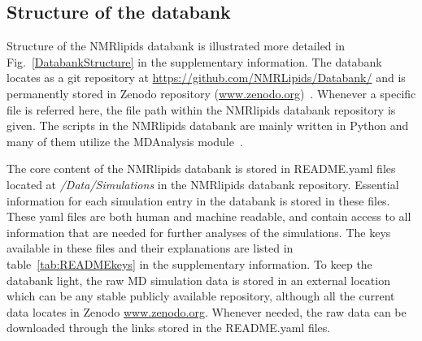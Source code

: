 \documentclass[fleqn,10pt]{wlscirep}
\begin{document}

\subsection{Structure of the databank}
Structure of the NMRlipids databank is illustrated more detailed in Fig.~\ref{DatabankStructure} in the supplementary information. The databank locates as a git repository at \url{https://github.com/NMRLipids/Databank/} and is permanently stored in Zenodo repository (\url{www.zenodo.org})~\cite{??}. Whenever a specific file is referred here, the file path within the NMRlipids databank repository is given. The scripts in the NMRlipids databank are mainly written in Python and many of them utilize the MDAnalysis module~\cite{gowers2019mdanalysis,michaud2011mdanalysis}.

The core content of the NMRlipids databank is stored in README.yaml files located at {\it /Data/Simulations} in the NMRlipids databank repository. Essential information for each simulation entry in the databank is stored in these files. These yaml files are both human and machine readable, and contain access to all information that are needed for further analyses of the simulations. The keys available in these files and their explanations are listed in table~\ref{tab:READMEkeys} in the supplementary information. To keep the databank light, the raw MD simulation data is stored in an external location which can be any stable publicly available repository, although all the current data locates in Zenodo \url{www.zenodo.org}. Whenever needed, the raw data can be downloaded through the links stored in the README.yaml files.  
\end{document}

